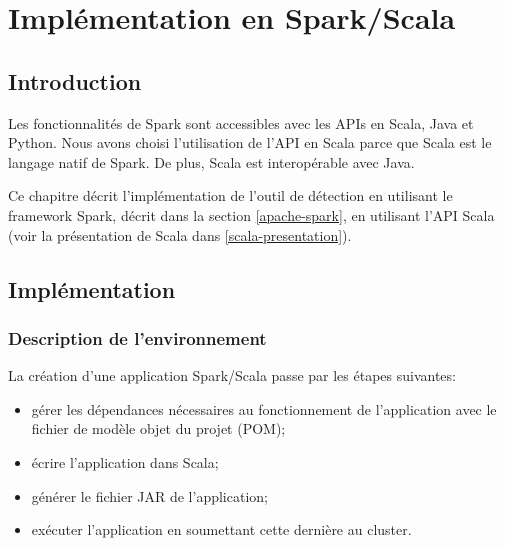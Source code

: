 \chapter{Implémentation  en Spark/Scala} \label{application:spark}

\section{Introduction}

Les fonctionnalités de Spark sont accessibles avec les  APIs en Scala, Java et Python. Nous avons choisi l'utilisation de l'API en Scala parce que Scala est le langage natif de Spark. De plus, Scala est interopérable avec Java. 

Ce chapitre  décrit  l'implémentation de l'outil de détection en utilisant le framework Spark, décrit dans la section \ref{apache-spark}, en utilisant l'API Scala (voir la présentation de Scala dans \ref{scala-presentation}). 



\section{Implémentation}
\subsection{Description de l'environnement}
La création d'une application Spark/Scala passe par les étapes suivantes:
\begin{itemize}
	\item gérer les dépendances nécessaires au fonctionnement de l'application avec le fichier de modèle objet du projet (POM);
	\item écrire l'application dans Scala;
	\item générer le fichier JAR de l'application;
	 \item  exécuter l'application en soumettant cette dernière au cluster. 
\end{itemize}

